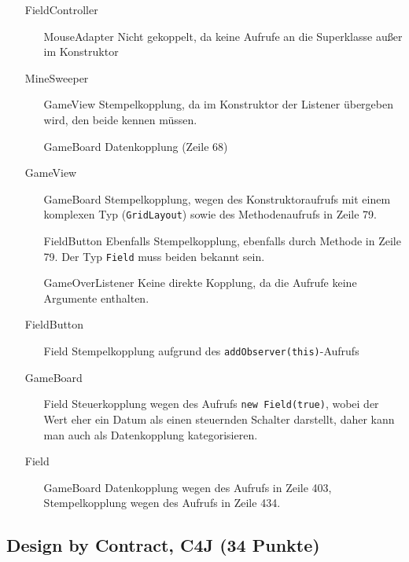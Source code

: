\documentclass{scrartcl}
\begin{document}
\begin{itemize}[font=\ttfamily,leftmargin=2cm,align=left]
   \item[FieldController] ~%
      \begin{itemize}[font=\ttfamily,align=left]
         \item[MouseAdapter] Nicht gekoppelt, da keine Aufrufe an die
            Superklasse außer im Konstruktor
      \end{itemize}
   \item[MineSweeper] ~ 
      \begin{itemize}[font=\ttfamily,align=left]
         \item[GameView] Stempelkopplung, da im Konstruktor der Listener
            übergeben wird, den beide kennen müssen.
         \item[GameBoard] Datenkopplung (Zeile 68)
      \end{itemize}
   \item[GameView] ~
      \begin{itemize}[font=\ttfamily,align=left]
         \item[GameBoard] Stempelkopplung, wegen des
            Konstruktoraufrufs mit einem komplexen Typ (\texttt{GridLayout})
            sowie des Methodenaufrufs in Zeile 79.
         \item[FieldButton] Ebenfalls Stempelkopplung, ebenfalls durch Methode
            in Zeile 79. Der Typ \texttt{Field} muss beiden bekannt sein.
         \item[GameOverListener] Keine direkte Kopplung, da die Aufrufe keine
            Argumente enthalten.
      \end{itemize}
   \item[FieldButton] ~
      \begin{itemize}[font=\ttfamily,align=left]
         \item[Field] Stempelkopplung aufgrund des
            \texttt{addObserver(this)}-Aufrufs
      \end{itemize}
   \item[GameBoard] ~
      \begin{itemize}[font=\ttfamily,align=left]
         \item[Field] Steuerkopplung wegen des Aufrufs \texttt{new Field(true)},
            wobei der Wert eher ein Datum als einen steuernden Schalter
            darstellt, daher kann man auch als Datenkopplung kategorisieren.
      \end{itemize}
   \item[Field] ~
      \begin{itemize}[font=\ttfamily,align=left]
         \item[GameBoard] Datenkopplung wegen des Aufrufs in Zeile 403,
            Stempelkopplung wegen des Aufrufs in Zeile 434.
      \end{itemize}
\end{itemize}
\subsection{Design by Contract, C4J (34 Punkte)}
\end{document}
